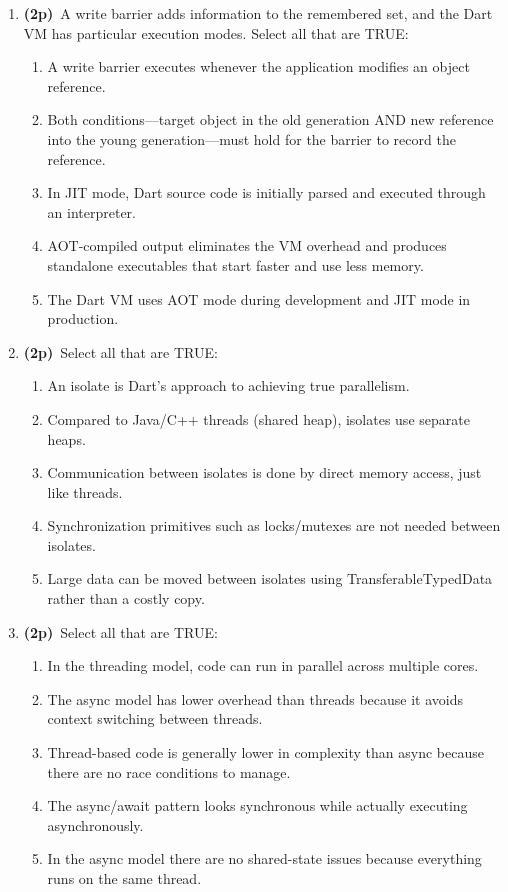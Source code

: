 \documentclass[11pt]{article}
\newcommand{\pts}{\textbf{(2p)}~}
\begin{document}
\begin{enumerate}
    \item \pts A write barrier adds information to the remembered set, and the Dart VM has particular execution modes. Select all that are TRUE:
    \begin{enumerate}
      \item A write barrier executes whenever the application modifies an object reference.
      \item Both conditions---target object in the old generation AND new reference into the young generation---must hold for the barrier to record the reference.
      \item In JIT mode, Dart source code is initially parsed and executed through an interpreter.
      \item AOT-compiled output eliminates the VM overhead and produces standalone executables that start faster and use less memory.
      \item The Dart VM uses AOT mode during development and JIT mode in production.
    \end{enumerate}

    \item \pts Select all that are TRUE:
    \begin{enumerate}
      \item An isolate is Dart's approach to achieving true parallelism.
      \item Compared to Java/C++ threads (shared heap), isolates use separate heaps.
      \item Communication between isolates is done by direct memory access, just like threads.
      \item Synchronization primitives such as locks/mutexes are not needed between isolates.
      \item Large data can be moved between isolates using TransferableTypedData rather than a costly copy.
    \end{enumerate}

    \item \pts Select all that are TRUE:
    \begin{enumerate}
      \item In the threading model, code can run in parallel across multiple cores.
      \item The async model has lower overhead than threads because it avoids context switching between threads.
      \item Thread-based code is generally lower in complexity than async because there are no race conditions to manage.
      \item The async/await pattern looks synchronous while actually executing asynchronously.
      \item In the async model there are no shared-state issues because everything runs on the same thread.
    \end{enumerate}


\end{enumerate}
\end{document}
